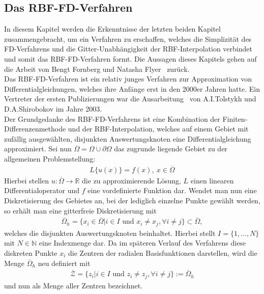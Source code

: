 \documentclass[12pt,titlepage]{article}
\begin{document}
\subsection{Das RBF-FD-Verfahren}
In diesem Kapitel werden die Erkenntnisse der letzten beiden Kapitel zusammengebracht, um ein Verfahren zu erschaffen, welches die Simplizität des FD-Verfahrens und die Gitter-Unabhängigkeit der RBF-Interpolation verbindet und somit das RBF-FD-Verfahren formt. Die Aussagen dieses Kapitels gehen auf die Arbeit von Bengt Fornberg und Natasha Flyer~\cite{fornberg2015primer} zurück.\\
Das RBF-FD-Verfahren ist ein relativ junges Verfahren zur Approximation von Differentialgleichungen, welches ihre Anfänge erst in den 2000er Jahren hatte. Ein Vertreter der ersten Publizierungen war die Ausarbeitung~\cite{tolstykh2003using} von  A.I.Tolstykh und D.A.Shirobokov im Jahre 2003.\\
Der Grundgedanke des RBF-FD-Verfahrens ist eine Kombination der Finiten-Differenzenmethode und der RBF-Interpolation, welches auf einem Gebiet mit zufällig ausgewählten, disjunkten Auswertungsknoten eine Differentialgleichung approximiert. Sei nun $\overline{\Omega}=\Omega\cup\partial\Omega$ das zugrunde liegende Gebiet zu der allgemeinen Problemstellung:
\begin{align}
 L\{u(x)\}=f(x),~x\in\overline{\Omega}\label{eq:FD-allgemein}
\end{align}
Hierbei stellen $u:\overline{\Omega}\rightarrow\mathbb{R}$ die zu approximierende Lösung, $L$ einen linearen Differentialoperator und $f$ eine vordefinierte Funktion dar. Wendet man nun eine Diskretisierung des Gebietes an, bei der lediglich einzelne Punkte gewählt werden, so erhält man eine gitterfreie Diskretisierung mit 
\begin{align*}
 \overline{\Omega}_h=\{x_i\in\overline{\Omega}|i\in I\text{ und }x_i\neq x_j,\forall i\neq j\}\subset\overline{\Omega},
\end{align*}
welches die disjunkten Auswertungsknoten beinhaltet. Hierbei stellt $I=\{1,\dots,N\}$ mit $N\in\mathbb{N}$ eine Indexmenge dar. Da im späteren Verlauf des Verfahrens diese diskreten Punkte $x_i$ die Zentren der radialen Basisfunktionen darstellen, wird die Menge $\overline{\Omega}_h$ neu definiert mit
\begin{align*}
 \overline{\mathcal{Z}}=\{z_i|i\in I\text{ und }z_i\neq z_j,\forall i\neq j\}:=\overline{\Omega}_h
\end{align*}
und nun als Menge aller Zentren bezeichnet.\\
\end{document}
